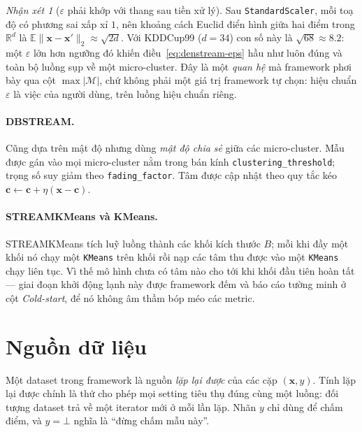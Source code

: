 \documentclass[11pt,a4paper]{article}
\theoremstyle{remark}
\newtheorem{remark}{Nhận xét}
\newcommand{\R}{\mathbb{R}}
\newcommand{\E}{\mathbb{E}}
\newcommand{\xt}{\mathbf{x}}
\begin{document}
\begin{remark}[$\varepsilon$ phải khớp với thang sau tiền xử lý]
\label{rem:eps}
Sau \texttt{StandardScaler}, mỗi toạ độ có phương sai xấp xỉ $1$, nên khoảng
cách Euclid điển hình giữa hai điểm trong $\R^{d}$ là
$\E\|\xt-\xt'\|_2 \approx \sqrt{2d}$. Với KDDCup99 ($d=34$) con số này là
$\sqrt{68}\approx 8.2$: một $\varepsilon$ lớn hơn ngưỡng đó khiến
điều~\eqref{eq:denstream-eps} hầu như luôn đúng và toàn bộ luồng sụp về một
micro-cluster. Đây là một \emph{quan hệ} mà framework phơi bày qua cột
$\max|\mathcal{M}|$, chứ không phải một giá trị framework tự chọn: hiệu chuẩn
$\varepsilon$ là việc của người dùng, trên luồng hiệu chuẩn riêng.
\end{remark}

\paragraph{DBSTREAM.}
Cũng dựa trên mật độ nhưng dùng \emph{mật độ chia sẻ} giữa các micro-cluster.
Mẫu được gán vào mọi micro-cluster nằm trong bán kính
\texttt{clustering\_threshold}; trọng số suy giảm theo \texttt{fading\_factor}.
Tâm được cập nhật theo quy tắc kéo $\mathbf{c} \leftarrow \mathbf{c} + \eta(\xt - \mathbf{c})$.

\paragraph{STREAMKMeans và KMeans.}
STREAMKMeans tích luỹ luồng thành các khối kích thước $B$; mỗi khi đầy một khối
nó chạy một \texttt{KMeans} trên khối rồi nạp các tâm thu được vào một
\texttt{KMeans} chạy liên tục. Vì thế mô hình chưa có tâm nào cho tới khi khối
đầu tiên hoàn tất --- giai đoạn khởi động lạnh này được framework đếm và báo cáo
tường minh ở cột \emph{Cold-start}, để nó không âm thầm bóp méo các metric.

\section{Nguồn dữ liệu}
\label{sec:datasets}

Một dataset trong framework là nguồn \emph{lặp lại được} của các cặp $(\xt, y)$.
Tính lặp lại được chính là thứ cho phép mọi setting tiêu thụ đúng cùng một luồng:
đối tượng dataset trả về một iterator mới ở mỗi lần lặp. Nhãn $y$ chỉ dùng để
chấm điểm, và $y = \bot$ nghĩa là ``đừng chấm mẫu này''.
\end{document}
